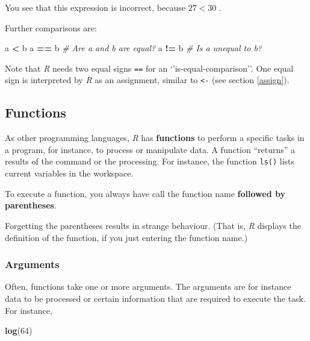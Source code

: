 \documentclass[
]{scrartcl}
\makeatletter
\newenvironment{Shaded}{\begin{snugshade}}{\end{snugshade}}
\newcommand{\CommentTok}[1]{\textcolor[rgb]{0.56,0.35,0.01}{\textit{#1}}}
\newcommand{\DecValTok}[1]{\textcolor[rgb]{0.00,0.00,0.81}{#1}}
\newcommand{\FunctionTok}[1]{\textcolor[rgb]{0.13,0.29,0.53}{\textbf{#1}}}
\newcommand{\NormalTok}[1]{#1}
\newcommand{\SpecialCharTok}[1]{\textcolor[rgb]{0.81,0.36,0.00}{\textbf{#1}}}
\newenvironment{kframe}{%
\medskip{}
\setlength{\fboxsep}{.8em}
 \def\at@end@of@kframe{}%
 \ifinner\ifhmode%
  \def\at@end@of@kframe{\end{minipage}}%
  \begin{minipage}{\columnwidth}%
 \fi\fi%
 \def\FrameCommand##1{\hskip\@totalleftmargin \hskip-\fboxsep
 \colorbox{shadecolor}{##1}\hskip-\fboxsep
     \hskip-\linewidth \hskip-\@totalleftmargin \hskip\columnwidth}%
 \MakeFramed {\advance\hsize-\width
   \@totalleftmargin\z@ \linewidth\hsize
   \@setminipage}}%
 {\par\unskip\endMakeFramed%
 \at@end@of@kframe}
\newenvironment{rmdblock}[1]
  {
  \begin{itemize}
  \renewcommand{\labelitemi}{
    \raisebox{-.7\height}[0pt][0pt]{
      {\setkeys{Gin}{width=3em,keepaspectratio}\texttt{[image: images/\#1]}}
    }
  }
  \setlength{\fboxsep}{1em}
  \begin{kframe}
  \item
  }
  {
  \end{kframe}
  \end{itemize}
  }
\newenvironment{important}
    {\begin{rmdblock}{hint}}
    {\end{rmdblock}}
\makeatother
\begin{document}
You see that this expression is incorrect, because \(27<30\) .

Further comparisons are:

\begin{Shaded}
\begin{Highlighting}[]
\NormalTok{a }\SpecialCharTok{\textless{}}\NormalTok{ b}
\NormalTok{a }\SpecialCharTok{==}\NormalTok{ b   }\CommentTok{\# Are a and b are equal?}
\NormalTok{a }\SpecialCharTok{!=}\NormalTok{ b   }\CommentTok{\# Is a unequal to b?}
\end{Highlighting}
\end{Shaded}

Note that \emph{R} needs two equal signs \texttt{==} for an `'is-equal-comparison''. One equal sign is interpreted by \emph{R} as an assignment, similar to \texttt{\textless{}-} (see section \ref{assign}).

\hypertarget{functions}{%
\subsection{Functions}\label{functions}}

As other programming languages, \emph{R} has \textbf{functions} to perform a specific tasks in a program, for instance, to process or manipulate data. A function ``returns'' a results of the command or the processing. For instance, the function \texttt{ls()} lists current variables in the workspace.

\begin{important}
To execute a function, you always have call the function name
\textbf{followed by parentheses}.

Forgetting the parentheses results in strange behaviour. (That is,
\emph{R} displays the definition of the function, if you just entering
the function name.)
\end{important}

\hypertarget{arguments}{%
\subsubsection{Arguments}\label{arguments}}

Often, functions take one or more arguments. The arguments are for instance data to be processed or certain information that are required to execute the task. For instance,

\begin{Shaded}
\begin{Highlighting}[]
\FunctionTok{log}\NormalTok{(}\DecValTok{64}\NormalTok{)}
\end{Highlighting}
\end{Shaded}
\end{document}
